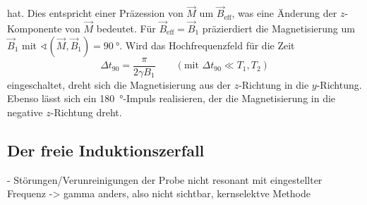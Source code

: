 hat.
Dies entspricht einer Präzession von $\vec{M}$ um $\vec{B}_\text{eff}$,
was eine Änderung der $z$-Komponente von $\vec{M}$ bedeutet.
Für $\vec{B}_\text{eff} = \vec{B}_1$ präzierdiert die Magnetisierung um $\vec{B}_1$
mit $\sphericalangle\!\left(\vec{M}, \vec{B}_1\right) = \SI{90}{\degree}$.
Wird das Hochfrequenzfeld für die Zeit
\begin{equation}
  \Delta t_{90} = \frac{\pi}{2 \gamma B_1}
  \quad\quad (\text{mit } \Delta t_{90} \ll T_1, T_2)
  \label{eqn:t90}
\end{equation}
eingeschaltet, dreht sich die Magnetisierung aus der $z$-Richtung in die
$y$-Richtung.
Ebenso lässt sich ein \SI{180}{\degree}-Impuls realisieren, der die Magnetisierung
in die negative $z$-Richtung dreht.


\subsection{Der freie Induktionszerfall}
\label{sec:FID}


- Störungen/Verunreinigungen der Probe nicht resonant mit eingestellter Frequenz
  -> gamma anders, also nicht sichtbar, kernselektve Methode

